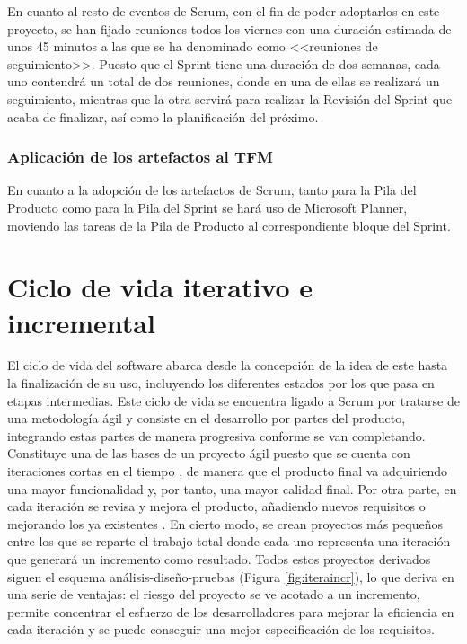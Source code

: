 En cuanto al resto de eventos de Scrum, con el fin de poder adoptarlos en este proyecto, se han fijado reuniones todos los viernes con una duración estimada de unos 45 minutos a las que se ha denominado como <<reuniones de seguimiento>>. Puesto que el Sprint tiene una duración de dos semanas, cada uno contendrá un total de dos reuniones, donde en una de ellas se realizará un seguimiento, mientras que la otra servirá para realizar la Revisión del Sprint que acaba de finalizar, así como la planificación del próximo.

\subsubsection{Aplicación de los artefactos al \acs{TFM}}
En cuanto a la adopción de los artefactos de Scrum, tanto para la Pila del Producto como para la Pila del Sprint se hará uso de Microsoft Planner, moviendo las tareas de la Pila de Producto al correspondiente bloque del Sprint.


\clearpage


\section{Ciclo de vida iterativo e incremental}
El ciclo de vida del software abarca desde la concepción de la idea de este hasta la finalización de su uso, incluyendo los diferentes estados por los que pasa en etapas intermedias. Este ciclo de vida se encuentra ligado a Scrum por tratarse de una metodología ágil y consiste en el desarrollo por partes del producto, integrando estas partes de manera progresiva conforme se van completando. Constituye una de las bases de un proyecto ágil puesto que se cuenta con iteraciones cortas en el tiempo \cite{javiergarzas2012}, de manera que el producto final va adquiriendo una mayor funcionalidad y, por tanto, una mayor calidad final. Por otra parte, en cada iteración se revisa y mejora el producto, añadiendo nuevos requisitos o mejorando los ya existentes \cite{proyectosagiles}. En cierto modo, se crean proyectos más pequeños entre los que se reparte el trabajo total donde cada uno representa una iteración que generará un incremento como resultado. Todos estos proyectos derivados siguen el esquema análisis-diseño-pruebas (Figura \ref{fig:iteraincr}), lo que deriva en una serie de ventajas: el riesgo del proyecto se ve acotado a un incremento, permite concentrar el esfuerzo de los desarrolladores para mejorar la eficiencia en cada iteración y se puede conseguir una mejor especificación de los requisitos.

